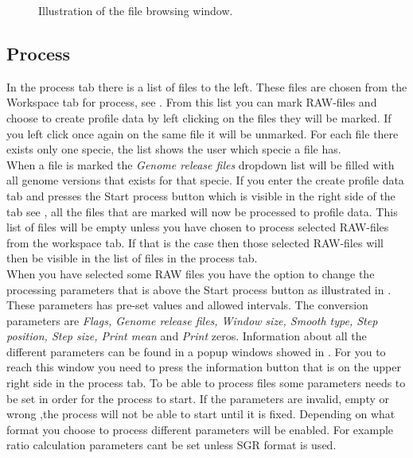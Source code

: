 \begin{figure}[h]
	\caption{Illustration of the file browsing window.}
	\label{fig:des_upload}
\end{figure}
\FloatBarrier

\subsection{Process}
In the process tab there is a list of files to the left. These files are chosen from the Workspace tab for process, see . From this list you can mark RAW-files and choose to create profile data by left clicking on the files they will be marked. If you left click once again on the same file it will be unmarked. For each file there exists only one specie, the list shows the user which specie a file has. \\ When a file is marked the \emph{Genome release files} dropdown list will be filled with all genome versions that exists for that specie. If you enter the create profile data tab and presses the Start process button which is visible in the right side of the tab see , all the files that are marked will now be processed to profile data. This list of files will be empty unless you have chosen to process selected RAW-files from the workspace tab. If that is the case then those selected RAW-files will then be visible in the list of files in the process tab. \\ When you have selected some RAW files you have the option to change the processing parameters that is above the Start process button as illustrated in . These parameters has pre-set values and allowed intervals. The conversion parameters are \emph{Flags, Genome release files, Window size, Smooth type, Step position, Step size, Print mean} and \emph{Print} zeros. Information about all the different parameters can be found in a popup windows showed in . For you to reach this window you need to press the information button that is on the upper right side in the process tab. To be able to process files some parameters needs to be set in order for the process to start. If the parameters are invalid, empty or wrong  ,the process will not be able to start until it is fixed. Depending on what format you choose to process different parameters will be enabled. For example ratio calculation parameters cant be set unless SGR format is used.

